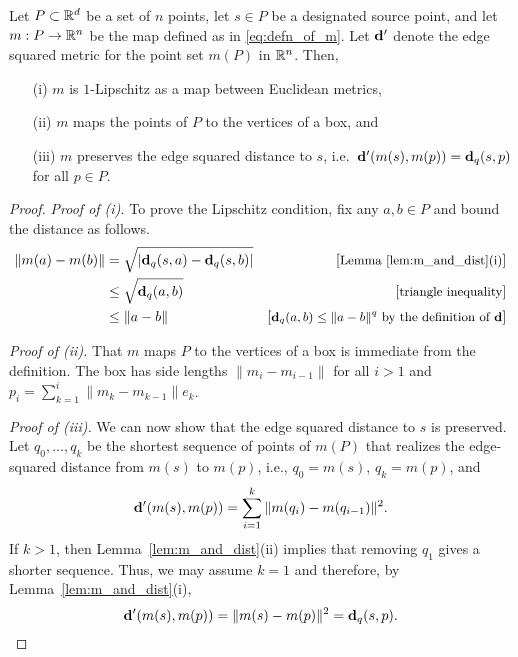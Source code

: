   \begin{prop}\label{prop:m_is_good}
    Let $P\subset\mathbb{R}^d$ be a set of $n$ points, let $s\in P$ be a designated source point, and let $m:P\to \mathbb{R}^n$ be the map defined as in \eqref{eq:defn_of_m}.
    Let $\mathbf{d}'$ denote the edge squared metric for the point set $m(P)$ in $\mathbb{R}^n$.
    Then,
    \begin{enumerate}
      \item[(i)] $m$ is $1$-Lipschitz as a map between Euclidean metrics,
      \item[(ii)] $m$ maps the points of $P$ to the vertices of a box, and
      \item[(iii)] $m$ preserves the edge squared distance to $s$, i.e.\ $\mathbf{d}'(m(s), m(p)) = \mathbf{d}_q(s,p)$ for all $p\in P$.
    \end{enumerate} 
  \end{prop}
  \begin{proof}
    \emph{Proof of (i).} To prove the Lipschitz condition, fix any $a,b\in P$ and bound the distance as follows.
    \begin{align*}
      \|m(a) - m(b)\| 
        &= \sqrt{|\mathbf{d}_q(s,a) - \mathbf{d}_q(s,b)|} &\left[\text{\small{Lemma~\ref{lem:m_and_dist}(i)}}\right]\\
        &\le \sqrt{\mathbf{d}_q(a,b)} &\left[\text{\small{triangle inequality}}\right]\\
        &\le \|a-b\| &\left[\text{\small{$\mathbf{d}_q(a,b)\le \|a-b\|^q$ by the definition of $\mathbf{d}$}}\right]
    \end{align*}

    \noindent
    \emph{Proof of (ii).} That $m$ maps $P$ to the vertices of a box is immediate from the definition.
    The box has side lengths $\|m_i - m_{i-1}\|$ for all $i>1$ and $p_i = \sum_{k=1}^i \|m_k - m_{k-1}\| e_k$.

    \noindent
    \emph{Proof of (iii).} We can now show that the edge squared distance to $s$ is preserved.
    Let $q_0,\ldots, q_k$ be the shortest sequence of points of $m(P)$ that realizes the edge-squared distance from $m(s)$ to $m(p)$, i.e., $q_0 = m(s)$, $q_k = m(p)$, and 
    \[
      \mathbf{d}'(m(s), m(p)) = \sum_{i = 1}^k \|m(q_i) - m(q_{i-1})\|^2.
    \]
    If $k> 1$, then Lemma~\ref{lem:m_and_dist}(ii) implies that removing $q_1$ gives a shorter sequence.
    Thus, we may assume $k = 1$ and therefore, by Lemma~\ref{lem:m_and_dist}(i),
    \[
      \mathbf{d}'(m(s), m(p)) = \|m(s) - m(p)\|^2 = \mathbf{d}_q(s,p).\qedhere
    \]
  \end{proof}
  

